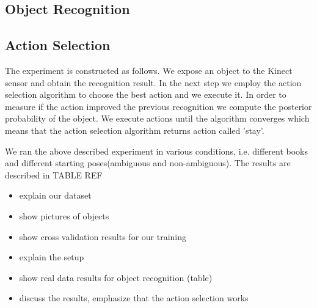 \documentclass[conference]{IEEEtran}
\begin{document}
\subsection{Object Recognition}




\subsection{Action Selection}
The experiment is constructed as follows. We expose an object to the Kinect sensor and obtain the recognition result. In the next step we employ the action selection algorithm to choose the best action and we execute it. In order to measure if the action improved the previous recognition we compute the posterior probability of the object. We execute actions until the algorithm converges which means that the action selection algorithm returns action called 'stay'.

We ran the above described experiment in various conditions, i.e. different books and different starting poses(ambiguous and non-ambiguous). The results are described in TABLE REF








%  




\begin{itemize}
\item explain our dataset
\item show pictures of objects
\item show cross validation results for our training
\item explain the setup
\item show real data results for object recognition (table)
\item discuss the results, emphasize that the action selection works
\end{itemize}
\end{document}
